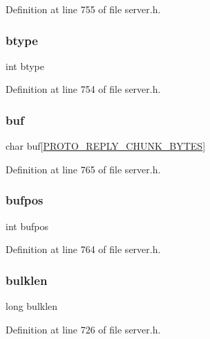Definition at line 755 of file server.\+h.

\mbox{\label{structclient_a2dfb71dc958547622b0169422cbd12c3}} 
\subsubsection{\texorpdfstring{btype}{btype}}
{\footnotesize\ttfamily int btype}



Definition at line 754 of file server.\+h.

\mbox{\label{structclient_aeaa96b202e891f899150ef91c52f77cd}} 
\subsubsection{\texorpdfstring{buf}{buf}}
{\footnotesize\ttfamily char buf\mbox{[}\hyperlink{server_8h_ab467e0a40be9097e85445616d9bb32e3}{P\+R\+O\+T\+O\+\_\+\+R\+E\+P\+L\+Y\+\_\+\+C\+H\+U\+N\+K\+\_\+\+B\+Y\+T\+ES}\mbox{]}}



Definition at line 765 of file server.\+h.

\mbox{\label{structclient_a9ae77be080d462d041a52c377da64482}} 
\subsubsection{\texorpdfstring{bufpos}{bufpos}}
{\footnotesize\ttfamily int bufpos}



Definition at line 764 of file server.\+h.

\mbox{\label{structclient_afdb54e1a6b1343bfb0535e4b0ceaa8a9}} 
\subsubsection{\texorpdfstring{bulklen}{bulklen}}
{\footnotesize\ttfamily long bulklen}



Definition at line 726 of file server.\+h.

